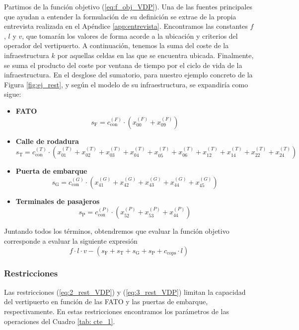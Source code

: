 \documentclass[12pt,a4paper]{book}
\begin{document}
Partimos de la función objetivo (\ref{eq:f_obj_VDP}). Una de las fuentes principales que ayudan a entender la formulación de su definición se extrae de la propia entrevista realizada en el Apéndice \ref{app:entrevista}. Encontramos las constantes $f$, $l$ y $v$, que tomarán los valores de forma acorde a la ubicación y criterios del operador del vertipuerto. A continuación, tenemos la suma del coste de la infraestructura $k$ por aquellas celdas en las que se encuentra ubicada. Finalmente, se suma el producto del coste por ventana de tiempo por el ciclo de vida de la infraestructura. En el desglose del sumatorio, para nuestro ejemplo concreto de la Figura \ref{fig:ej_rest}, y  según el modelo de su infraestructura, se expandiría como sigue:
\begin{itemize}
	\item \textbf{FATO}
		\begin{equation}
			s_{\text{F}} = c_{\text{con}}^{(F)}\cdot \left( x_{00}^{(F)}+ x_{09}^{(F)} \right)
			\label{eq:desglose_ej_f_obj_VDP_FATO}
		\end{equation}
	\item \textbf{Calle de rodadura}
		\begin{equation}
			s_{\text{T}} = c_{\text{con}}^{(T)}\cdot \left( x_{01}^{(T)}+x_{02}^{(T)}+x_{03}^{(T)}+x_{04}^{(T)}+x_{05}^{(T)}+x_{06}^{(T)}+x_{12}^{(T)}+x_{14}^{(T)}+x_{22}^{(T)}+x_{24}^{(T)}     \right) \label{eq:desglose_ej_f_obj_VDP_taxi}
		\end{equation}
	\item \textbf{Puerta de embarque}
		\begin{equation}
			s_{\text{G}} = c_{\text{con}}^{(G)}\cdot \left( x_{41}^{(G)}+ x_{42}^{(G)}+x_{43}^{(G)}+x_{44}^{(G)}+x_{45}^{(G)} \right) \label{eq:desglose_ej_f_obj_VDP_gate}
		\end{equation}
	\item \textbf{Terminales de pasajeros}
		\begin{equation}
			s_{\text{P}} = c_{\text{con}}^{(P)}\cdot \left( x_{52}^{(P)}+x_{53}^{(P)}+x_{44}^{(P)} \right) \label{eq:desglose_ej_f_obj_VDP_P}
		\end{equation}
\end{itemize}
Juntando todos los términos, obtendremos que evaluar la función objetivo corresponde a evaluar la siguiente expresión
\begin{equation}
 f \cdot l \cdot v-(s_{\text{F}}+s_{\text{T}}+s_{\text{G}}+s_{\text{P}} + c_{\text{cops}} \cdot l) 
\end{equation}
\subsubsection{Restricciones}
Las restricciones (\ref{eq:2_rest_VDP}) y (\ref{eq:3_rest_VDP}) limitan la capacidad del vertipuerto en función de las FATO y las puertas de embarque, respectivamente. En estas restricciones encontramos los parámetros de las operaciones del Cuadro \ref{tab: cte_1}. 
\end{document}

